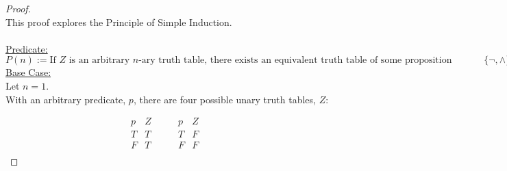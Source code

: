 \documentclass[12pt]{article}
\begin{document}
\begin{proof}
\leavevmode\\
    This proof explores the Principle of Simple Induction. \\
    \\
    \underline{Predicate:} \\
    \footnotesize
    $P(n):= \text{If $Z$ is an arbitrary $n$-ary truth table, there exists an equivalent truth table of some proposition constructed using only $\{\neg, \land\}$.}$
    \normalsize
    \underline{Base Case:} \\
    Let $n = 1$. \\
    With an arbitrary predicate, $p$, there are four possible unary truth tables, $Z$:

    \begin{displaymath}
        \begin{array}{|c|c|}  %
            p & Z \\ %
            \hline %
            T & T \\
            F & T \\
        \end{array}
        \qquad
        \begin{array}{|c|c|}  %
            p & Z \\ %
            \hline %
            T & F \\
            F & F \\
        \end{array}
        \qquad
        \begin{array}{|c|c|}  %

\end{array}
\end{displaymath}
\end{proof}
\end{document}
